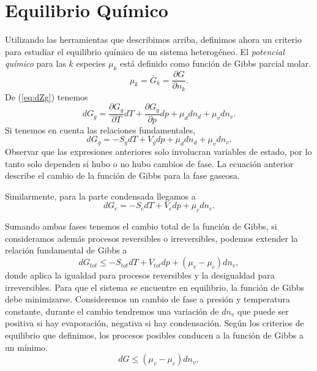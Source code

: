 \documentclass[openany]{book}
\begin{document}
\section{Equilibrio Químico}
Utilizando las herramientas que describimos arriba, definimos ahora un criterio para estudiar el equilibrio químico de un sistema heterogéneo. El \emph{potencial químico} para las $k$ especies $\mu_{k}$ está definido como función de Gibbs parcial molar.
\begin{equation}\label{eq:pot-quimk}
	\mu_{k}=\overline{G}_{k}=\frac{\partial G}{\partial n_{k}}.
\end{equation}
De (\ref{eq:dZg}) tenemos
\begin{equation}\label{eq:dGg}
	dG_{g}=\frac{\partial G_{g}}{\partial T}dT+\frac{\partial G_{g}}{\partial p}dp+\mu_{d}dn_{d}+\mu_{v}dn_{v}.
\end{equation}
Si tenemos en cuenta las relaciones fundamentales,
\begin{equation}\label{eq:dGg-SV}
	dG_{g}=-S_{g}dT+V_{g}dp+\mu_{d}dn_{d}+\mu_{v}dn_{v}.
\end{equation}
Observar que las expresiones anteriores solo involucran variables de estado, por lo tanto solo dependen si hubo o no hubo cambios de fase. La ecuación anterior describe el cambio de la función de Gibbs para la fase gaseosa.
\par Similarmente, para la parte condensada llegamos a
\begin{equation}\label{eq:dGc-SV}
	dG_{c}=-S_{c}dT+V_{c}dp+\mu_{c}dn_{c}.
\end{equation}
\par Sumando ambas fases tenemos el cambio total de la función de Gibbs, si consideramos además procesos reversibles o irreversibles, podemos extender la relación fundamental de Gibbs a
\begin{equation}\label{eq:dG-relfundamental}
	dG_{tot}\leq-S_{tot}dT+V_{tot}dp+(\mu_{v}-\mu_{c})dn_{v},
\end{equation}
donde aplica la igualdad para procesos reversibles y la desigualdad para irreversibles. Para que el sistema se encuentre en equilibrio, la función de Gibbs debe minimizarse. Consideremos un cambio de fase a presión y temperatura constante, durante el cambio tendremos una variación de $dn_{v}$ que puede ser positiva si hay evaporación, negativa si hay condensación. Según los criterios de equilibrio que definimos, los procesos posibles conducen a la función de Gibbs a un mínimo.
\begin{equation*}
	dG\leq(\mu_{v}-\mu_{c})dn_{v},
\end{equation*}
\end{document}
